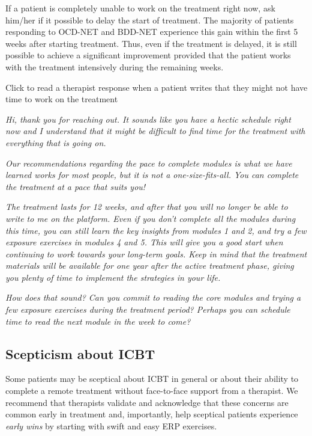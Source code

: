 \documentclass[]{book}
\begin{document}
If a patient is completely unable to work on the treatment right now, ask him/her if it possible to delay the start of treatment. The majority of patients responding to OCD-NET and BDD-NET experience this gain within the first 5 weeks after starting treatment. Thus, even if the treatment is delayed, it is still possible to achieve a significant improvement provided that the patient works with the treatment intensively during the remaining weeks.

Click to read a therapist response when a patient writes that they might not have time to work on the treatment

\emph{Hi, thank you for reaching out. It sounds like you have a hectic schedule right now and I understand that it might be difficult to find time for the treatment with everything that is going on.}

\emph{Our recommendations regarding the pace to complete modules is what we have learned works for most people, but it is not a one-size-fits-all. You can complete the treatment at a pace that suits you!}

\emph{The treatment lasts for 12 weeks, and after that you will no longer be able to write to me on the platform. Even if you don't complete all the modules during this time, you can still learn the key insights from modules 1 and 2, and try a few exposure exercises in modules 4 and 5. This will give you a good start when continuing to work towards your long-term goals. Keep in mind that the treatment materials will be available for one year after the active treatment phase, giving you plenty of time to implement the strategies in your life.}

\emph{How does that sound? Can you commit to reading the core modules and trying a few exposure exercises during the treatment period? Perhaps you can schedule time to read the next module in the week to come?}

\hypertarget{scepticism-about-icbt}{%
\subsection{Scepticism about ICBT}\label{scepticism-about-icbt}}

Some patients may be sceptical about ICBT in general or about their ability to complete a remote treatment without face-to-face support from a therapist. We recommend that therapists validate and acknowledge that these concerns are common early in treatment and, importantly, help sceptical patients experience \emph{early wins} by starting with swift and easy ERP exercises.
\end{document}
